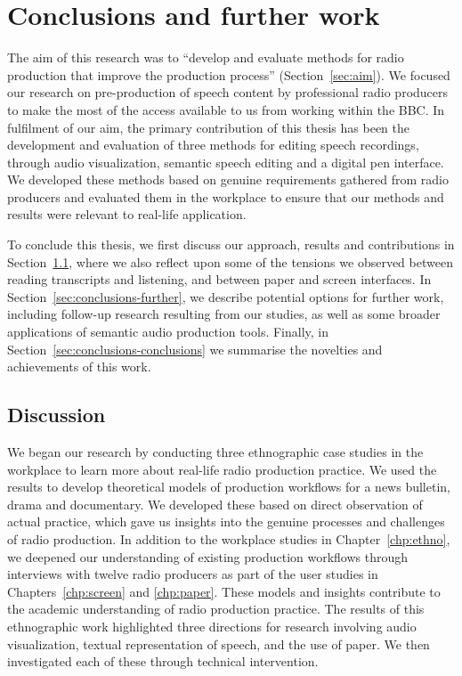 \chapter{Conclusions and further work}\label{chp:conclusions}

The aim of this research was to ``develop and evaluate methods for radio production that improve the production
process'' (Section~\ref{sec:aim}).  We focused our research on pre-production of speech content by professional radio
producers to make the most of the access available to us from working within the BBC.  In fulfilment of our aim, the
primary contribution of this thesis has been the development and evaluation of three methods for editing speech
recordings, through audio visualization, semantic speech editing and a digital pen interface.  We developed these
methods based on genuine requirements gathered from radio producers and evaluated them in the workplace to
ensure that our methods and results were relevant to real-life application.

To conclude this thesis, we first discuss our approach, results and contributions in
Section~\ref{sec:conclusions-discussion}, where we also reflect upon some of the tensions we observed between reading
transcripts and listening, and between paper and screen interfaces.  In Section~\ref{sec:conclusions-further}, we
describe potential options for further work, including follow-up research resulting from our studies, as well as some
broader applications of semantic audio production tools.  Finally, in Section~\ref{sec:conclusions-conclusions} we
summarise the novelties and achievements of this work.

\section{Discussion}\label{sec:conclusions-discussion}

We began our research by conducting three ethnographic case studies in the workplace to learn more about real-life
radio production practice.  We used the results to develop theoretical models of production workflows for a news
bulletin, drama and documentary.  We developed these based on direct observation of actual practice, which gave us 
insights into the genuine processes and challenges of radio production.  In addition to the workplace studies in
Chapter~\ref{chp:ethno}, we deepened our understanding of existing production workflows through interviews with twelve
radio producers as part of the user studies in Chapters~\ref{chp:screen} and \ref{chp:paper}.  These models and
insights contribute to the academic understanding of radio production practice.  The results of this ethnographic work
highlighted three directions for research involving audio visualization, textual representation of speech, and the use
of paper.  We then investigated each of these through technical intervention.

